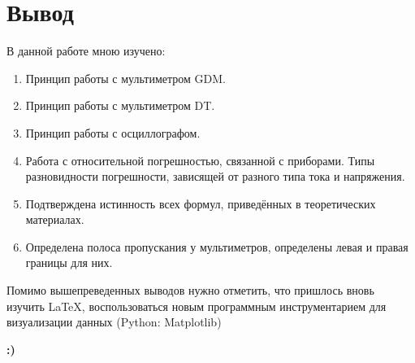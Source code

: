 \documentclass[a4paper,12pt]{article}
\begin{document}
\section{Вывод}

В данной работе мною изучено:
\begin{enumerate}
    \item Принцип работы с мультиметром GDM.
    \item Принцип работы с мультиметром DT.
    \item Принцип работы с осциллографом.
    \item Работа с относительной погрешностью, связанной с приборами. Типы разновидности погрешности, зависящей от разного типа тока и напряжения.
    \item Подтверждена истинность всех формул, приведённых в теоретических материалах.
    \item Определена полоса пропускания у мультиметров, определены левая и правая границы для них.
\end{enumerate}
Помимо вышепреведенных выводов нужно отметить, что пришлось вновь изучить \LaTeX, воспользоваться новым программным инструментарием для визуализации данных (Python: Matplotlib)

\centering \textbf{:)}
\end{document}
